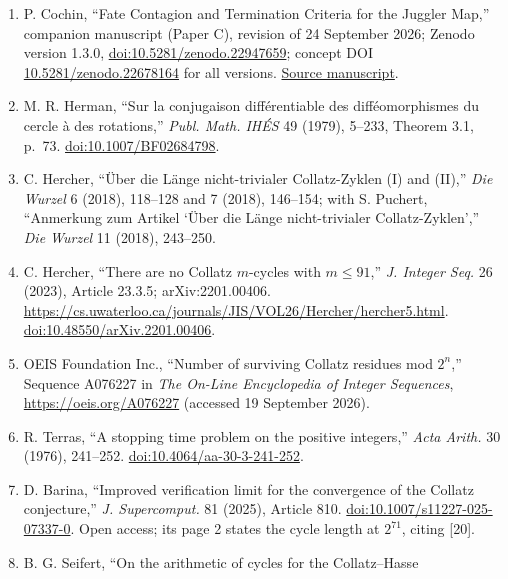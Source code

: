 \documentclass[12pt]{article}
\begin{document}
\begin{enumerate}
  \href{https://github.com/sneakyweasel/btlab/blob/main/docs/theory/juggler_parity_discrepancy_note.md}{Source
  manuscript}.
\item
  P. Cochin, ``Fate Contagion and Termination Criteria for the Juggler
  Map,'' companion manuscript (Paper C), revision of 24 September 2026;
  Zenodo version 1.3.0,
  \href{https://doi.org/10.5281/zenodo.22947659}{doi:10.5281/zenodo.22947659};
  concept DOI
  \href{https://doi.org/10.5281/zenodo.22678164}{10.5281/zenodo.22678164}
  for all versions.
  \href{https://github.com/sneakyweasel/btlab/blob/main/docs/theory/juggler_fate_almost_all_note.md}{Source
  manuscript}.
\item
  M. R. Herman, ``Sur la conjugaison diff\'{e}rentiable des
  diff\'{e}omorphismes du cercle \`{a} des rotations,'' \emph{Publ.
  Math. IH\'{E}S} 49 (1979), 5--233, Theorem 3.1, p.~73.
  \href{https://doi.org/10.1007/BF02684798}{doi:10.1007/BF02684798}.
\item
  C. Hercher, ``\"{U}ber die L\"{a}nge nicht-trivialer Collatz-Zyklen
  (I) and (II),'' \emph{Die Wurzel} 6 (2018), 118--128 and 7 (2018),
  146--154; with S. Puchert, ``Anmerkung zum Artikel `\"{U}ber die
  L\"{a}nge nicht-trivialer Collatz-Zyklen','' \emph{Die Wurzel} 11
  (2018), 243--250.
\item
  C. Hercher, ``There are no Collatz \(m\)-cycles with \(m\le 91\),''
  \emph{J. Integer Seq.} 26 (2023), Article 23.3.5; arXiv:2201.00406.
  \url{https://cs.uwaterloo.ca/journals/JIS/VOL26/Hercher/hercher5.html}.
  \href{https://doi.org/10.48550/arXiv.2201.00406}{doi:10.48550/arXiv.2201.00406}.
\item
  OEIS Foundation Inc., ``Number of surviving Collatz residues mod
  \(2^n\),'' Sequence A076227 in \emph{The On-Line Encyclopedia of
  Integer Sequences}, \url{https://oeis.org/A076227} (accessed 19
  September 2026).
\item
  R. Terras, ``A stopping time problem on the positive integers,''
  \emph{Acta Arith.} 30 (1976), 241--252.
  \href{https://doi.org/10.4064/aa-30-3-241-252}{doi:10.4064/aa-30-3-241-252}.
\item
  D. Barina, ``Improved verification limit for the convergence of the
  Collatz conjecture,'' \emph{J. Supercomput.} 81 (2025), Article 810.
  \href{https://doi.org/10.1007/s11227-025-07337-0}{doi:10.1007/s11227-025-07337-0}.
  Open access; its page 2 states the cycle length at \(2^{71}\), citing
  {[}20{]}.
\item
  B. G. Seifert, ``On the arithmetic of cycles for the Collatz--Hasse

\end{enumerate}
\end{document}
